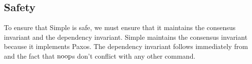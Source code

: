 
\subsection{Safety}
To ensure that Simple \BPaxos{} is safe, we must ensure that it maintains the
consensus invariant and the dependency invariant. Simple \BPaxos{} maintains
the consensus invariant because it implements Paxos.  The dependency invariant
follows immediately from  and the fact that $\text{noop}$s
don't conflict with any other command.
